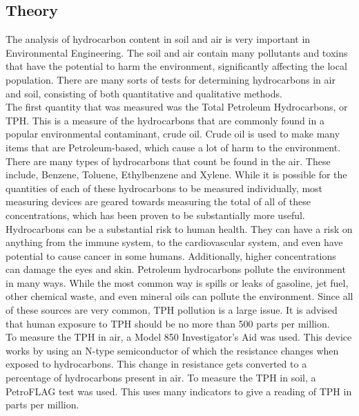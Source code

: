 \documentclass{article}
\begin{document}
    \subsection{Theory}
    \indent The analysis of hydrocarbon content in soil and air is very important in Environmental Engineering. The soil and air contain many pollutants and toxins that have the potential to harm the environment, significantly affecting the local population. There are many sorts of tests for determining hydrocarbons in air and soil, consisting of both quantitative and qualitative methods.\\
    \indent The first quantity that was measured was the Total Petroleum Hydrocarbons, or TPH. This is a measure of the hydrocarbons that are commonly found in a popular environmental contaminant, crude oil. Crude oil is used to make many items that are Petroleum-based, which cause a lot of harm to the environment. There are many types of hydrocarbons that count be found in the air. These include, Benzene, Toluene, Ethylbenzene and Xylene. While it is possible for the quantities of each of these hydrocarbons to be measured individually, most measuring devices are geared towards measuring the total of all of these concentrations, which has been proven to be substantially more useful. Hydrocarbons can be a substantial risk to human health. They can have a risk on anything from the immune system, to the cardiovascular system, and even have potential to cause cancer in some humans. Additionally, higher concentrations can damage the eyes and skin. Petroleum hydrocarbons pollute the environment in many ways. While the most common way is spills or leaks of gasoline, jet fuel, other chemical waste, and even mineral oils can pollute the environment. Since all of these sources are very common, TPH pollution is a large issue. It is advised that human exposure to TPH should be no more than 500 parts per million.\\
    \indent To measure the TPH in air, a Model 850 Investigator's Aid was used. This device works by using an N-type semiconductor of which the resistance changes when exposed to hydrocarbons. This change in resistance gets converted to a percentage of hydrocarbons present in air. To measure the TPH in soil, a PetroFLAG test was used. This uses many indicators to give a reading of TPH in parts per million.\\
\end{document}
